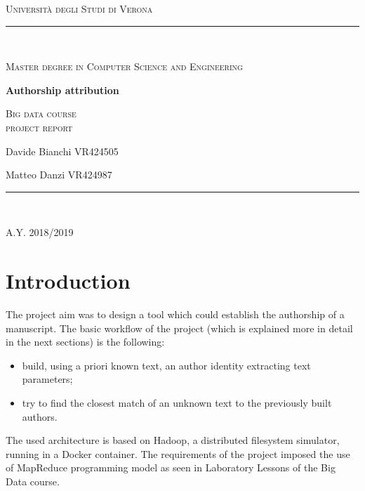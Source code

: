 \documentclass[a4paper,11pt, twoside]{article}
\begin{document}
	\clearpage
	\begin{titlepage}
		\centering
		{\scshape\LARGE Università degli Studi di Verona \par}
		\noindent\rule{\textwidth}{0.5pt}\\
		{\scshape\large Master degree in Computer Science and Engineering\par}
		\vspace{6cm}
		{\huge\bfseries Authorship attribution\par}
		\vspace{1cm}
		{\Large\scshape Big data course\\ \large project report\par}
		\vspace{2cm}
		{\large Davide Bianchi VR424505\par
		\large Matteo Danzi VR424987\par}
		\vspace{1cm}
		\vspace{5cm}
		\vspace*{\fill}
		\noindent\rule{\textwidth}{0.5pt}\\
		{\large A.Y. 2018/2019\par}
	\end{titlepage}
	\thispagestyle{empty}
	\newpage
	\tableofcontents
	\newpage
	
	\section{Introduction}
	The project aim was to design a tool which could establish the authorship of a manuscript. The basic workflow of the project (which is explained more in detail in the next sections) is the following:\begin{itemize}
		\item build, using a priori known text, an author identity extracting text parameters;
		\item try to find the closest match of an unknown text to the previously built authors.
	\end{itemize}

	The used architecture is based on Hadoop, a distributed filesystem simulator, running in a Docker container. The requirements of the project imposed the use of MapReduce programming model as seen in Laboratory Lessons of the Big Data course.
	
\end{document}
